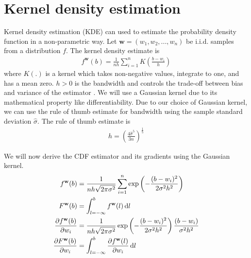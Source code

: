 \section{Kernel density estimation}
Kernel density estimation (KDE) can used to estimate the probability density function in a non-parametric way. Let $ \mathbf{w} = \left( w_1, w_2, ..., w_n\right)$ be i.i.d. samples from a distribution $f$. The kernel density estimate is
\begin{align}
    f^\mathbf{w} (b) = \frac{1}{nh} \sum_{i=1}^{n} K\left(\frac{b-w_i}{h}\right) \label{eqn:kde}
\end{align}
where $K(.)$ is a kernel which takes non-negative values, integrate to one, and has a mean zero. $h > 0$ is the bandwidth and controls the trade-off between bias and variance of the estimator . We will use a Gaussian kernel due to its mathematical property like differentiability. Due to our choice of Gaussian kernel, we can use the rule of thumb estimate \cite{silverman1986density} for bandwidth using the sample standard deviation $\hat{\sigma}$. The rule of thumb estimate is
\begin{align}
    h = \left( \frac{4 \hat{\sigma}^5}{3n}\right)^{\frac{1}{5}} \label{eqn:kdebw}
\end{align}

We will now derive the CDF estimator and its gradients using the Gaussian kernel.
\begin{align}
    f^\mathbf{w} (b) &= \frac{1}{nh \sqrt{2 \pi \sigma^2}} \sum_{i=1}^{n} \exp \left( -\frac{(b-w_i)^2} {2 \sigma^2 h^2}\right) \\
    F^\mathbf{w} (b) &= \int_{l=-\infty}^{b} f^\mathbf{w} (l) \mathop{}\!\mathrm{d} l \label{eqn:kdecdf} \\
    \frac{\partial f^\mathbf{w} (b)}{\partial w_i} &=  \frac{1}{nh \sqrt{2 \pi \sigma^2}} \exp \left( -\frac{(b-w_i)^2} {2 \sigma^2 h^2}\right) \frac{ \left( b - w_i \right) }{ \sigma^2 h^2} \\
    \frac{\partial F^\mathbf{w} (b)} {\partial w_i} &= \int
    _{l=-\infty}^{b} \frac{\partial f^\mathbf{w} (l)}{\partial w_i} \mathop{}\!\mathrm{d} l
\end{align}

